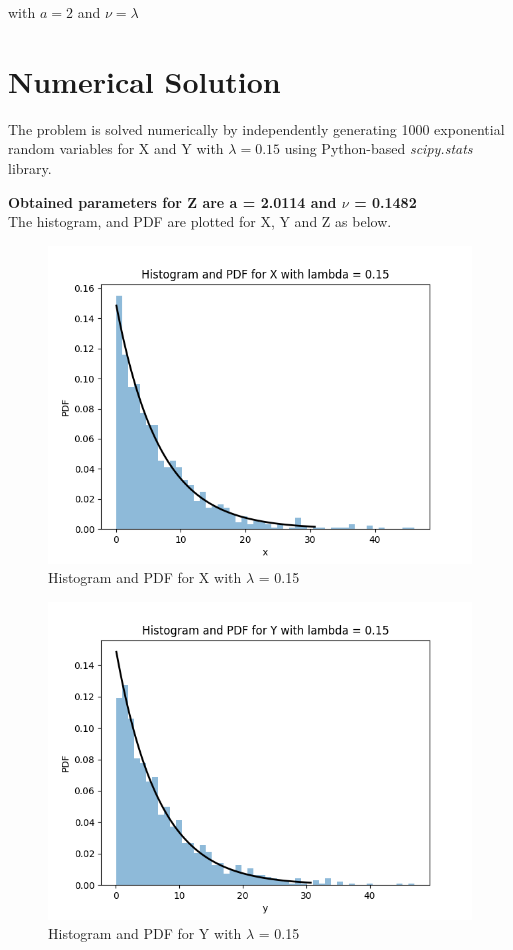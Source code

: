 with $a = 2 $ and $\nu = \lambda$

\section{Numerical Solution} 
The problem is solved numerically by independently generating 1000 exponential random variables for X and Y with $\lambda = 0.15$  using Python-based \textit{scipy.stats} library.

\textbf{Obtained parameters for Z are a = 2.0114 and $\nu$ = 0.1482 \\}
The histogram, and PDF are plotted for X, Y and Z as below. \\

\begin{figure}
	\centering
	\includegraphics[width=0.9\linewidth]{Figures/Chapter1/Figure_1}
	\caption{Histogram and PDF for X with $\lambda$ = 0.15}
	\label{fig:figure1}
\end{figure}

\begin{figure}
	\centering
	\includegraphics[width=0.9\linewidth]{Figures/Chapter1/Figure_2}
	\caption{Histogram and PDF for Y with $\lambda$ = 0.15}
	\label{fig:figure2}
\end{figure}


